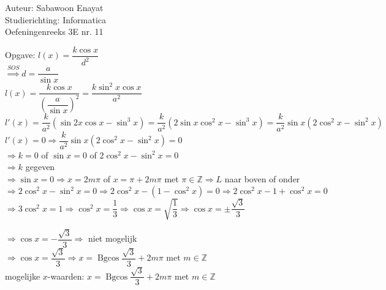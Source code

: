 \documentclass[a4paper]{article}
\begin{document}
  
\noindent \large Auteur: Sabawoon Enayat      \\
\noindent \large Studierichting: Informatica  \\
\noindent \large Oefeningenreeks 3E nr. 11 \\

\newcommand{\Bgcos}{\operatorname{Bgcos}}

\medskip

\normalsize

Opgave: $l(x) = \dfrac{k\cos x}{d^2}$\\

$\overset{SOS}{\Rightarrow } d = \dfrac{a}{\sin x}$\\

$l(x) = \dfrac{k\cos x}{\left(\dfrac{a}{\sin x}\right)^2} = \dfrac{k\sin^2 x \cos x}{a^2 }$\\

$l'(x) = \dfrac{k}{a^2}\left(\sin 2x \cos x - \sin^3 x\right) = \dfrac{k}{a^2}\left(2\sin x \cos^2 x - \sin^3 x\right) = \dfrac{k}{a^2}\sin x\left(2\cos^2 x - \sin^2 x\right)$\\

$l'(x) = 0 \Rightarrow \dfrac{k}{a^2}\sin x\left(2\cos^2 x - \sin^2 x\right) = 0$\\

$\Rightarrow k = 0$ of $\sin x = 0$ of $2\cos^2 x - \sin^2 x = 0$\\

$\Rightarrow k$ gegeven\\

$\Rightarrow \sin x = 0 \Rightarrow x = 2m\pi$ of $x = \pi + 2m\pi$ met $\pi \in \mathbb{Z} \Rightarrow L $ naar boven of onder\\

$\Rightarrow 2\cos^2 x - \sin^2 x = 0 \Rightarrow 2\cos^2 x - (1 - \cos^2 x) = 0 \Rightarrow 2\cos^2 x - 1 + \cos^2 x = 0$\\

$\Rightarrow 3\cos^2 x = 1 \Rightarrow \cos^2 x = \dfrac{1}{3} \Rightarrow \cos x = \sqrt{\dfrac{1}{3}} \Rightarrow \cos x = \pm \dfrac{\sqrt{3}}{3}$

$\Rightarrow \cos x = -\dfrac{\sqrt{3}}{3} \Rightarrow$ niet mogelijk\\

$\Rightarrow \cos x = \dfrac{\sqrt{3}}{3} \Rightarrow x = \Bgcos \dfrac{\sqrt{3}}{3} + 2m\pi$ met $m \in \mathbb{Z}$\\

mogelijke $x$-waarden: $x = \Bgcos \dfrac{\sqrt{3}}{3} + 2m\pi$ met $m \in \mathbb{Z}$\\
\end{document}
